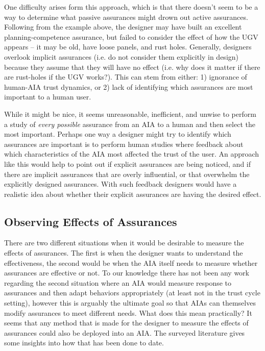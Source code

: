     One difficulty arises form this approach, which is that there doesn't seem to be a way to determine what passive assurances might drown out active assurances. Following from the example above, the designer may have built an excellent planning-competence assurance, but failed to consider the effect of how the UGV appears -- it may be old, have loose panels, and rust holes. Generally, designers overlook implicit assurances (i.e. do not consider them explicitly in design) because they assume that they will have no effect (i.e. why does it matter if there are rust-holes if the UGV works?). This can stem from either: 1) ignorance of human-AIA trust dynamics, or 2) lack of identifying which assurances are most important to a human user.

    While it might be nice, it seems unreasonable, inefficient, and unwise to perform a study of \emph{every possible} assurance from an AIA to a human and then select the most important. Perhaps one way a designer might try to identify which assurances are important is to perform human studies where feedback about which characteristics of the AIA most affected the trust of the user. An approach like this would help to point out if explicit assurances are being noticed, and if there are implicit assurances that are overly influential, or that overwhelm the explicitly designed assurances. With such feedback designers would have a realistic idea about whether their explicit assurances are having the desired effect.

\subsection{Observing Effects of Assurances} \label{sec:measuring_effects}

    There are two different situations when it would be desirable to measure the effects of assurances. The first is when the designer wants to understand the effectiveness, the second would be when the AIA itself needs to measure whether assurances are effective or not. To our knowledge there has not been any work regarding the second situation where an AIA would measure response to assurances and then adapt behaviors appropriately (at least not in the trust cycle setting), however this is arguably the ultimate goal so that AIAs can themselves modify assurances to meet different needs. What does this mean practically? It seems that any method that is made for the designer to measure the effects of assurances could also be deployed into an AIA. The surveyed literature gives some insights into how that has been done to date.
   

